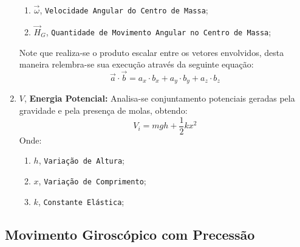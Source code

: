 \documentclass{article}
\begin{document}
\begin{enumerate}[rightmargin = \leftmargin]
\begin{enumerate}[rightmargin = \leftmargin, noitemsep]
                            \item $\vec{\omega}$, \texttt{Velocidade Angular do Centro de Massa};

                            \item $\vec{H}_{G}$, \texttt{Quantidade de Movimento Angular no Centro de Massa};
                        \end{enumerate}
                    Note que realiza-se o produto escalar entre os vetores envolvidos, desta maneira relembra-se sua execução através da seguinte equação:
                        \begin{equation}
                            \boxed{
                                \vec{a} \cdot \vec{b} = 
                                a_{x} \cdot b_{x} + 
                                a_{y} \cdot b_{y} + 
                                a_{z} \cdot b_{z}
                            }
                        \end{equation}

                    \item $V$, \textbf{Energia Potencial:} Analisa-se conjuntamento potenciais geradas pela gravidade e pela presença de molas, obtendo:
                        \begin{equation}
                            \boxed{
                                V_{i} = 
                                m g h +
                                \frac{1}{2} k x^{2} 
                            }\label{eq.PotencialEnergy}
                        \end{equation}
                    Onde:
                        \begin{enumerate}[rightmargin = \leftmargin, noitemsep]
                            \item $h$, \texttt{Variação de Altura};
                            \item $x$, \texttt{Variação de Comprimento};
                            \item $k$, \texttt{Constante Elástica};
                        \end{enumerate}
                \end{enumerate}
\newpage

        \subsection{Movimento Giroscópico com Precessão}
\end{document}
